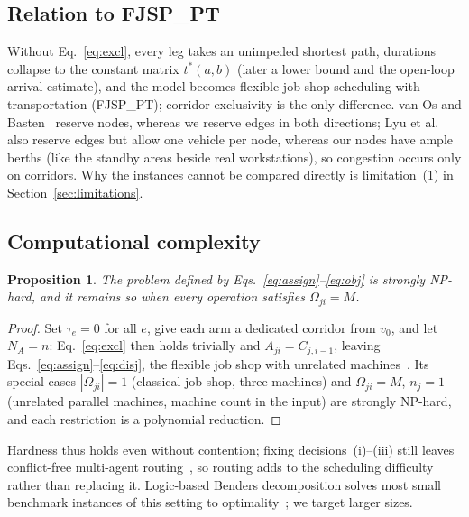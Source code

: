 \documentclass[manuscript,screen,review]{acmart}
\newtheorem{prop}{Proposition}
\begin{document}
\subsection{Relation to FJSP\_PT}
\label{sec:fjsppt}

Without Eq.~\eqref{eq:excl}, every leg takes an unimpeded shortest path, durations collapse to the constant matrix $t^{*}(a,b)$ (later a lower bound and the open-loop arrival estimate), and the model becomes flexible job shop scheduling with transportation (FJSP\_PT); corridor exclusivity is the only difference.
van Os and Basten~\cite{vanos2026exact} reserve nodes, whereas we reserve edges in both directions; Lyu et al.~\cite{lyu2019approach} also reserve edges but allow one vehicle per node, whereas our nodes have ample berths (like the standby areas beside real workstations), so congestion occurs only on corridors.
Why the instances cannot be compared directly is limitation~(1) in Section~\ref{sec:limitations}.

\subsection{Computational complexity}

\begin{prop}
\label{prop:np_hard}
The problem defined by Eqs.~\eqref{eq:assign}--\eqref{eq:obj} is strongly NP-hard, and it remains so when every operation satisfies
$\Omega_{ji}=M$.
\end{prop}

\begin{proof}
Set $\tau_e=0$ for all $e$, give each arm a dedicated corridor from $v_0$, and let $N_A=n$: Eq.~\eqref{eq:excl} then holds trivially and $A_{ji}=C_{j,i-1}$, leaving Eqs.~\eqref{eq:assign}--\eqref{eq:disj}, the flexible job shop with unrelated machines~\cite{dauzereperes2024fjsp}.
Its special cases $|\Omega_{ji}|=1$ (classical job shop, three machines) and $\Omega_{ji}=M$, $n_j=1$ (unrelated parallel machines, machine count in the input) are strongly NP-hard, and each restriction is a polynomial reduction.
\end{proof}

Hardness thus holds even without contention; fixing decisions~(i)--(iii) still leaves conflict-free multi-agent routing~\cite{gao2023mapf}, so routing adds to the scheduling difficulty rather than replacing it.
Logic-based Benders decomposition solves most small benchmark instances of this setting to optimality~\cite{vanos2026exact}; we target larger sizes.
\end{document}
